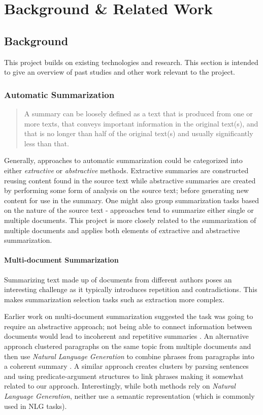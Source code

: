 \chapter{Background \& Related Work\label{chap:background-related}}
  \section{Background}
    This project builds on existing technologies and research. This section is intended to give an overview of past studies and other work relevant to the project.

    \tocless\subsection{Automatic Summarization}
      \blockquote{A summary can be loosely defined as a text that is produced from one or more texts, that conveys important information in the original text(s), and that is no longer than half of the original text(s) and usually significantly less than that.} \cite{radev2002introduction}

      Generally, approaches to automatic summarization could be categorized into either \textit{extractive} or \textit{abstractive} methods. Extractive summaries are constructed reusing content found in the source text while abstractive summaries are created by performing some form of analysis on the source text; before generating new content for use in the summary. One might also group summarization tasks based on the nature of the source text - approaches tend to summarize either single or multiple documents. This project is more closely related to the summarization of multiple documents and applies both elements of extractive and abstractive summarization.

      \tocless\subsubsection{Multi-document Summarization}

        Summarizing text made up of documents from different authors poses an interesting challenge as it typically introduces repetition and contradictions. This makes summarization selection tasks such as extraction more complex.

        Earlier work on multi-document summarization suggested the task was going to require an abstractive approach; not being able to connect information between documents would lead to incoherent and repetitive summaries \cite{McKeown1999TMS315149315355}. An alternative approach clustered paragraphs on the same topic from multiple documents and then use \textit{Natural Language Generation} to combine phrases from paragraphs into a coherent summary \cite{McKeown1999TMS315149315355}. A similar approach creates clusters by parsing sentences and using predicate-argument structures to link phrases \cite{barzilay1999information} making it somewhat related to our approach. Interestingly, while both methods rely on \textit{Natural Language Generation}, neither use a semantic representation (which is commonly used in NLG tasks).

